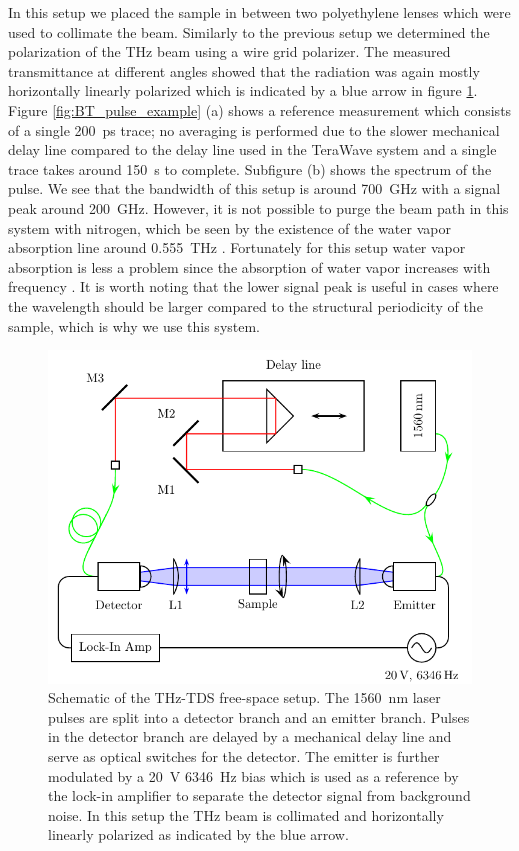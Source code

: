In this setup we placed the sample in between two polyethylene lenses which were used to collimate the beam. Similarly to the previous setup we determined the polarization of the THz beam using a wire grid polarizer. The measured transmittance at different angles showed that the radiation was again mostly horizontally linearly polarized which is indicated by a blue arrow in figure \ref{fig:THz_bowtie_setup}. Figure \ref{fig:BT_pulse_example} (a) shows a reference measurement which consists of a single \SI{200}{\pico \second} trace; no averaging is performed due to the slower mechanical delay line compared to the delay line used in the TeraWave system and a single trace takes around \SI{150}{\second} to complete. Subfigure (b) shows the spectrum of the pulse. We see that the bandwidth of this setup is around \SI{700}{\giga \hertz} with a signal peak around \SI{200}{\giga \hertz}. However, it is not possible to purge the beam path in this system with nitrogen, which be seen by the existence of the water vapor absorption line around \SI{0.555}{\tera \hertz} \cite{VanExter1989}. Fortunately for this setup water vapor absorption is less a problem since the absorption of water vapor increases with frequency \cite{Series2019}. It is worth noting that the lower signal peak is useful in cases where the wavelength should be larger compared to the structural periodicity of the sample, which is why we use this system.

\begin{figure}[H]
    \centering
    \includegraphics{images/setup/Setup-THz-TDS-Lab1.pdf}
    \caption{Schematic of the THz-TDS free-space setup. The \SI{1560}{\nano \meter} laser pulses are split into a detector branch and an emitter branch. Pulses in the detector branch are delayed by a mechanical delay line and serve as optical switches for the detector. The emitter is further modulated by a \SI{20}{\volt} \SI{6346}{\hertz} bias which is used as a reference by the lock-in amplifier to separate the detector signal from background noise. In this setup the THz beam is collimated and horizontally linearly polarized as indicated by the blue arrow.}
    \label{fig:THz_bowtie_setup}
\end{figure}

